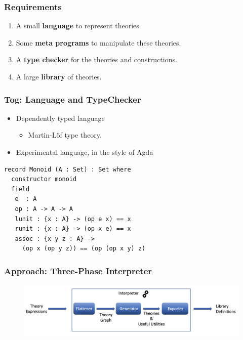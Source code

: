 \documentclass[t,10pt,numbers,fleqn,usenames,xcolor=dvipsnames]{beamer}
\begin{document}
\begin{frame}[fragile]
\frametitle{Requirements}
\begin{enumerate}
\item A small \textbf{language} to represent theories. 
\vspace{0.5cm}
\item Some \textbf{meta programs} to manipulate these theories. 
\vspace{0.5cm}
\item A \textbf{type checker} for the theories and constructions. 
\vspace{0.5cm}
\item A large \textbf{library} of theories.
\end{enumerate}
\end{frame}

\begin{frame}[fragile]
\frametitle{Tog: Language and TypeChecker}
\begin{itemize}
    \item Dependently typed language 
    \begin{itemize}
        \item Martin-L\"{o}f type theory. 
    \end{itemize}
    \item Experimental language, in the style of Agda 
\end{itemize}
\begin{verbatim}
record Monoid (A : Set) : Set where
  constructor monoid
  field
   e  : A
   op : A -> A -> A
   lunit : {x : A} -> (op e x) == x
   runit : {x : A} -> (op x e) == x
   assoc : {x y z : A} -> 
     (op x (op y z)) == (op (op x y) z)
\end{verbatim}
\end{frame}

\begin{frame}[fragile]
\frametitle{Approach: Three-Phase Interpreter} 
\begin{figure}
    \includegraphics[scale=0.2]{figures/interpreter_detailed.png}
\end{figure}
\end{frame}
\end{document}

